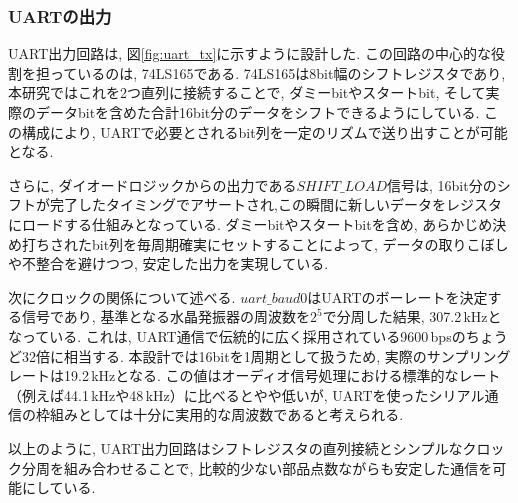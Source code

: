 \documentclass[a4paper,10pt]{article}
\begin{document}
\begin{multicols}{2}[\raggedcolumns]
\subsubsection{UARTの出力}
UART出力回路は, 図\ref{fig:uart_tx}に示すように設計した.  
この回路の中心的な役割を担っているのは, 74LS165である.  
74LS165は8bit幅のシフトレジスタであり, 本研究ではこれを2つ直列に接続することで, ダミーbitやスタートbit, そして実際のデータbitを含めた合計16bit分のデータをシフトできるようにしている.  
この構成により, UARTで必要とされるbit列を一定のリズムで送り出すことが可能となる.  

さらに, ダイオードロジックからの出力である$SHIFT\_LOAD$信号は, 16bit分のシフトが完了したタイミングでアサートされ,この瞬間に新しいデータをレジスタにロードする仕組みとなっている.  
ダミーbitやスタートbitを含め, あらかじめ決め打ちされたbit列を毎周期確実にセットすることによって, データの取りこぼしや不整合を避けつつ, 安定した出力を実現している.  

次にクロックの関係について述べる.  
$uart\_baud0$はUARTのボーレートを決定する信号であり, 基準となる水晶発振器の周波数を$2^5$で分周した結果, 307.2\,kHzとなっている.  
これは, UART通信で伝統的に広く採用されている9600\,bpsのちょうど32倍に相当する.  
本設計では16bitを1周期として扱うため, 実際のサンプリングレートは19.2\,kHzとなる.  
この値はオーディオ信号処理における標準的なレート（例えば44.1\,kHzや48\,kHz）に比べるとやや低いが, UARTを使ったシリアル通信の枠組みとしては十分に実用的な周波数であると考えられる.  

以上のように, UART出力回路はシフトレジスタの直列接続とシンプルなクロック分周を組み合わせることで, 比較的少ない部品点数ながらも安定した通信を可能にしている.  


\end{multicols}
\end{document}
